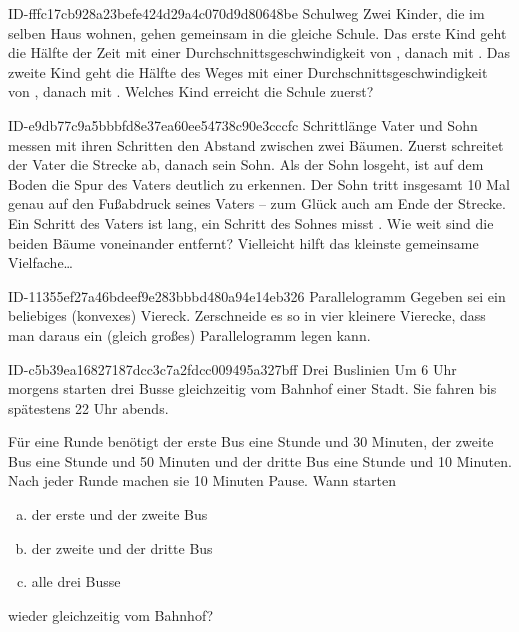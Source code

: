 \begin{exercise}
      {ID-fffc17cb928a23befe424d29a4c070d9d80648be}
      {Schulweg}
  \ifproblem\problem
    Zwei Kinder, die im selben Haus wohnen, gehen gemeinsam in die gleiche
    Schule. Das erste Kind geht die Hälfte der Zeit mit einer
    Durchschnittsgeschwindigkeit von , danach mit . Das
    zweite Kind geht die Hälfte des Weges mit einer Durchschnittsgeschwindigkeit
    von , danach mit . Welches Kind erreicht die Schule
    zuerst?
  \fi
\end{exercise}

\begin{exercise}
      {ID-e9db77c9a5bbbfd8e37ea60ee54738c90e3cccfc}
      {Schrittlänge}
  \ifproblem\problem
    Vater und Sohn messen mit ihren Schritten den Abstand zwischen zwei Bäumen.
    Zuerst schreitet der Vater die Strecke ab, danach sein Sohn. Als der Sohn
    losgeht, ist auf dem Boden die Spur des Vaters deutlich zu erkennen.
    Der Sohn tritt insgesamt 10 Mal genau auf den Fußabdruck seines Vaters --
    zum Glück auch am Ende der Strecke. Ein Schritt des Vaters ist 
    lang, ein Schritt des Sohnes misst . Wie weit sind die beiden
    Bäume voneinander entfernt?
  \fi
  \ifoutline\outline
    Vielleicht hilft das kleinste gemeinsame Vielfache\ldots
  \fi
\end{exercise}

\begin{exercise}
      {ID-11355ef27a46bdeef9e283bbbd480a94e14eb326}
      {Parallelogramm}
  \ifproblem\problem
    Gegeben sei ein beliebiges (konvexes) Viereck. Zerschneide es so in vier
    kleinere Vierecke, dass man daraus ein (gleich großes) Parallelogramm legen
    kann.
  \fi
\end{exercise}

\begin{exercise}
      {ID-c5b39ea16827187dcc3c7a2fdcc009495a327bff}
      {Drei Buslinien}
  \ifproblem\problem
    Um 6 Uhr morgens starten drei Busse gleichzeitig vom Bahnhof einer Stadt.
    Sie fahren bis spätestens 22 Uhr abends.\par
    Für eine Runde benötigt
    der erste Bus eine Stunde und 30 Minuten,
    der zweite Bus eine Stunde und 50 Minuten und
    der dritte Bus eine Stunde und 10 Minuten.
    Nach jeder Runde machen sie 10 Minuten Pause.
    Wann starten
    \begin{enumerate}[a)]
      \item der erste und der zweite Bus
      \item der zweite und der dritte Bus
      \item alle drei Busse
    \end{enumerate}
    wieder gleichzeitig vom Bahnhof?
  \fi
\end{exercise}


